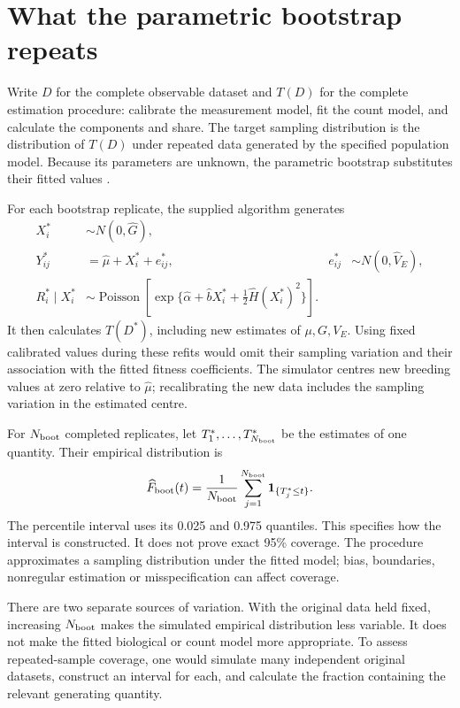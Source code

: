 \section{What the parametric bootstrap repeats}
\label{estimation:bootstrap}

Write \(D\) for the complete observable dataset and \(T(D)\) for the complete
estimation procedure: calibrate the measurement model, fit the count model,
and calculate the components and share. The target sampling distribution is
the distribution of \(T(D)\) under repeated data generated by the specified
population model. Because its parameters are unknown, the parametric
bootstrap substitutes their fitted values \citep{Efron1979}.

For each bootstrap replicate, the supplied algorithm generates
\begin{align}
 X_i^*&\sim N(0,\widehat G),\nonumber\\
 Y_{ij}^*&=\widehat\mu+X_i^*+e_{ij}^*,
 &e_{ij}^*&\sim N(0,\widehat V_E),\nonumber\\
 R_i^*\mid X_i^*&\sim
 \operatorname{Poisson}\!\left[
 \exp\{\widehat\alpha+\widehat bX_i^*
                 +\tfrac12\widehat H(X_i^*)^2\}\right].
 \label{estimation:bootstrap_model}
\end{align}
It then calculates \(T(D^*)\), including new estimates of \(\mu,G,V_E\).
Using fixed calibrated values during these refits would omit their
sampling variation and their association with the fitted fitness
coefficients. The simulator centres new breeding values at zero relative to
\(\widehat\mu\); recalibrating the new data includes the sampling variation
in the estimated centre.

For \(N_{\rm boot}\) completed replicates, let \(T_1^*,\ldots,T_{N_{\rm boot}}^*\)
be the estimates of one quantity. Their empirical distribution is
\[
 \widehat F_{\rm boot}(t)
 =\frac1{N_{\rm boot}}\sum_{j=1}^{N_{\rm boot}}
   {\boldsymbol1}_{\{T_j^*\leq t\}}.
\]
The percentile interval uses its 0.025 and 0.975 quantiles. This specifies
how the interval is constructed. It does not prove exact 95\% coverage.
The procedure approximates a sampling distribution under the fitted model;
bias, boundaries, nonregular estimation or misspecification can affect
coverage.

There are two separate sources of variation. With the original data held
fixed, increasing \(N_{\rm boot}\) makes the simulated empirical distribution
less variable. It does not make the fitted biological or count model more
appropriate. To assess repeated-sample coverage, one would simulate many
independent original datasets, construct an interval for each, and calculate
the fraction containing the relevant generating quantity.

